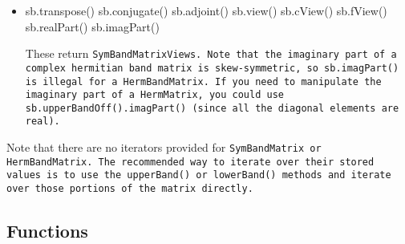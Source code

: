 \begin{itemize}
\item
\begin{tmvcode}
sb.transpose()
sb.conjugate()
sb.adjoint()
sb.view()
sb.cView()
sb.fView()
sb.realPart()
sb.imagPart()
\end{tmvcode}
These return \tt{SymBandMatrixView}s.
Note that the imaginary part of a complex hermitian band matrix is
skew-symmetric, so \tt{sb.imagPart()} is illegal for a \tt{HermBandMatrix}.
If you need to manipulate the imaginary part of a \tt{HermMatrix}, 
you could use
\tt{sb.upperBandOff().imagPart()} 
(since all the diagonal elements are real).

\end{itemize}

Note that there are no iterators provided for \tt{SymBandMatrix} or \tt{HermBandMatrix}.  The recommended way to iterate over their stored values is to use the \tt{upperBand()} or \tt{lowerBand()} methods and iterate over those portions of the matrix directly.

\subsection{Functions}
\label{SymBandMatrix_Functions}

